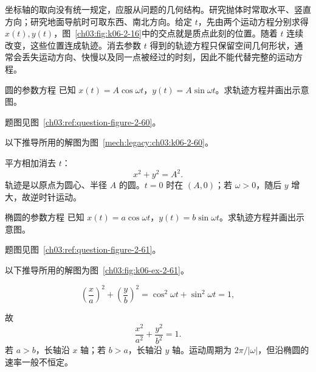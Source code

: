 {坐标轴的取向没有统一规定，应服从问题的几何结构。研究抛体时常取水平、竖直方向；研究地面导航时可取东西、南北方向。给定 $t$，先由两个运动方程分别求得 $x(t),y(t)$，图~\ref{ch03:fig:k06-2-16}中的交点就是质点此刻的位置。随着 $t$ 连续改变，这些位置连成轨迹。消去参数 $t$ 得到的轨迹方程只保留空间几何形状，通常会丢失运动方向、快慢以及同一点被经过的时刻，因此不能代替完整的运动方程。


\begin{origexamplebox}{圆的参数方程}\label{ch03:ex:k06-2-60}
已知 $x(t)=A\cos\omega t$，$y(t)=A\sin\omega t$。求轨迹方程并画出示意图。
\par 题图见图~\ref{ch03:ref:question-figure-2-60}。
\KQuestionCI
\end{origexamplebox}
\begin{xesolution}
以下推导所用的解图为图~\ref{mech:legacy:ch03:k06-2-60}。

平方相加消去 $t$：
\[
 \boxed{x^2+y^2=A^2}.
\]
轨迹是以原点为圆心、半径 $A$ 的圆。$t=0$ 时在 $(A,0)$；若 $\omega>0$，随后 $y$ 增大，故逆时针运动。
\begin{center}\begin{qualityfigure}
\label{mech:legacy:ch03:k06-2-60}
\end{qualityfigure}\end{center}
\end{xesolution}


\begin{origexamplebox}{椭圆的参数方程}\label{ch03:ex:k06-2-61}
已知 $x(t)=a\cos\omega t$，$y(t)=b\sin\omega t$。求轨迹方程并画出示意图。
\par 题图见图~\ref{ch03:ref:question-figure-2-61}。
\KQuestionCJ
\end{origexamplebox}
\begin{xesolution}
以下推导所用的解图为图~\ref{ch03:fig:k06-ex-2-61}。

\[
 \left(\frac xa\right)^2+\left(\frac yb\right)^2
 =\cos^2\omega t+\sin^2\omega t=1,
\]
\ParametricEllipseDiagram

故
\[
 \boxed{\frac{x^2}{a^2}+\frac{y^2}{b^2}=1}.
\]
若 $a>b$，长轴沿 $x$ 轴；若 $b>a$，长轴沿 $y$ 轴。运动周期为 $2\pi/|\omega|$，但沿椭圆的速率一般不恒定。
\end{xesolution}

}

